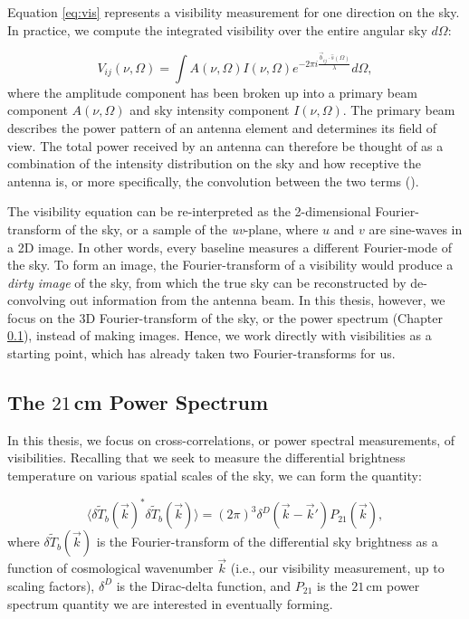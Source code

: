 Equation \eqref{eq:vis} represents a visibility measurement for one direction on the sky. In practice, we compute the integrated visibility over the entire angular sky $d\Omega$:

\begin{equation}
V_{ij}(\nu,\Omega) = \int A(\nu,\Omega)I(\nu,\Omega) e^{-2\pi i\frac{\vec{b}_{ij}\cdot \hat{s}(\Omega)}{\lambda}}d\Omega,
\end{equation}
where the amplitude component has been broken up into a primary beam component $A(\nu,\Omega)$ and sky intensity component $I(\nu,\Omega)$. The primary beam describes the power pattern of an antenna element and determines its field of view. The total power received by an antenna can therefore be thought of as a combination of the intensity distribution on the sky and how receptive the antenna is, or more specifically, the convolution between the two terms (\citealt{thompson_et_al2001}).

The visibility equation can be re-interpreted as the 2-dimensional Fourier-transform of the sky, or a sample of the \textit{uv}-plane, where $u$ and $v$ are sine-waves in a 2D image. In other words, every baseline measures a different Fourier-mode of the sky. To form an image, the Fourier-transform of a visibility would produce a \textit{dirty image} of the sky, from which the true sky can be reconstructed by de-convolving out information from the antenna beam. In this thesis, however, we focus on the 3D Fourier-transform of the sky, or the power spectrum (Chapter \ref{sec:PSoverview}), instead of making images. Hence, we work directly with visibilities as a starting point, which has already taken two Fourier-transforms for us. 

\subsection{The $21$\,cm Power Spectrum}
\label{sec:PSoverview}

In this thesis, we focus on cross-correlations, or power spectral measurements, of visibilities. Recalling that we seek to measure the differential brightness temperature on various spatial scales of the sky, we can form the quantity:

\begin{equation}
\label{eq:PSdef}
\langle \delta \tilde{T}_{b}(\vec{k})^{\ast} \delta \tilde{T}_{b}(\vec{k})\rangle = (2\pi)^{3} \delta^{D}(\vec{k}-\vec{k}')P_{21}(\vec{k}) ,
\end{equation}
where $\delta \tilde{T}_{b}(\vec{k})$ is the Fourier-transform of the differential sky brightness as a function of cosmological wavenumber $\vec{k}$ (i.e., our visibility measurement, up to scaling factors), $\delta^{D}$ is the Dirac-delta function, and $P_{21}$ is the $21$\,cm power spectrum quantity we are interested in eventually forming.

